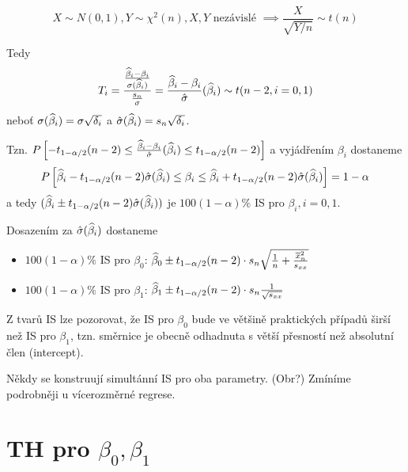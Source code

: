 \begin{remark}
	\begin{equation*}
		X \sim N(0,1), Y \sim \chi^2(n), X, Y \text{ nezávislé } \implies \frac{X}{\sqrt{Y/n}} \sim t(n)
	\end{equation*}
\end{remark}

Tedy
\begin{equation*}
	T_i = \frac{\frac{\widehat{\beta}_i - \beta_i}{\sigma(\widehat{\beta}_i)}}{\frac{s_n}{\sigma}} = \frac{\widehat{\beta}_i - \beta_i}{\hat{\sigma}}(\widehat{\beta}_i) \sim t(n-2, i = 0,1)
\end{equation*}
neboť $\sigma(\widehat{\beta}_i) = \sigma \sqrt{\delta_i}$ a $\hat{\sigma}(\widehat{\beta}_i) = s_n \sqrt{\delta_i}$.

Tzn. $P \left[ -t_{1-\alpha/2}(n-2) \leq \frac{\widehat{\beta}_i - \beta_i}{\hat{\sigma}}(\widehat{\beta}_i) \leq t_{1-\alpha/2}(n-2) \right]$ a vyjádřením $\beta_i$ dostaneme
\begin{equation*}
	P \left[ \widehat{\beta}_i - t_{1-\alpha/2}(n-2) \hat{\sigma}(\widehat{\beta}_i) \leq \beta_i \leq  \widehat{\beta}_i + t_{1-\alpha/2}(n-2) \hat{\sigma}(\widehat{\beta}_i) \right] = 1 - \alpha
\end{equation*}
a tedy $(\widehat{\beta}_i \pm t_{1-\alpha/2}(n-2) \hat{\sigma}(\widehat{\beta}_i))$ je $100(1-\alpha)\%$ IS pro $\beta_i, i = 0,1$.

Dosazením za $\hat{\sigma}(\widehat{\beta}_i)$ dostaneme

\begin{itemize}
	\item $100(1-\alpha)\%$ IS pro $\beta_0$: $\widehat{\beta}_0 \pm t_{1-\alpha/2}(n-2) \cdot s_n \sqrt{\frac{1}{n} + \frac{\overline{x}_n^2}{s_{xx}}}$
	\item $100(1-\alpha)\%$ IS pro $\beta_1$: $\widehat{\beta}_1 \pm t_{1-\alpha/2}(n-2) \cdot s_n \frac{1}{\sqrt{s_{xx}}}$
\end{itemize}

\begin{remark}
	Z tvarů IS lze pozorovat, že IS pro $\beta_0$ bude ve většině praktických případů širší než IS pro $\beta_1$, tzn. směrnice je obecně odhadnuta s větší přesností než absolutní člen (intercept).
\end{remark}


\begin{remark}
	Někdy se konstruují simultánní IS pro oba parametry. (Obr?) Zmíníme podrobněji u vícerozměrné regrese.
\end{remark}


\section{TH pro $\beta_0, \beta_1$}

